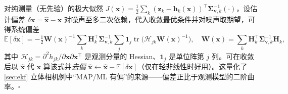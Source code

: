 \begin{derivation}[（选读）ML 偏差的近似闭式]
对纯测量（无先验）的极大似然 $J(\mathbf{x})=\tfrac12\sum_k(\mathbf{z}_k-\mathbf{h}_k(\mathbf{x}))^\top\boldsymbol{\Sigma}_{\mathbf{v},k}^{-1}(\cdot)$，设估计偏差 $\delta\mathbf{x}=\hat{\mathbf{x}}-\mathbf{x}$ 对噪声至多二次依赖，代入收敛最优条件并对噪声取期望，可得系统偏差\cite{barfoot2024state}
\[
  \mathbb{E}[\delta\mathbf{x}]=-\tfrac12\mathbf{W}(\mathbf{x})^{-1}\sum_k\mathbf{H}_k^\top\boldsymbol{\Sigma}_{\mathbf{v},k}^{-1}\sum_j\mathbf{1}_j\operatorname{tr}\!\big(\boldsymbol{\mathcal{H}}_{jk}\mathbf{W}(\mathbf{x})^{-1}\big),\quad
  \mathbf{W}(\mathbf{x})=\sum_k\mathbf{H}_k^\top\boldsymbol{\Sigma}_{\mathbf{v},k}^{-1}\mathbf{H}_k,
\]
其中 $\boldsymbol{\mathcal{H}}_{jk}=\partial^2 h_{jk}/\partial\mathbf{x}\partial\mathbf{x}^\top$ 是观测分量的 Hessian、$\mathbf{1}_j$ 是单位阵第 $j$ 列。可在收敛后以 $\hat{\mathbf{x}}$ 代 $\mathbf{x}$ 算该式并\emph{去偏} $\hat{\mathbf{x}}\leftarrow\hat{\mathbf{x}}-\mathbb{E}[\delta\mathbf{x}]$（仅在轻非线性时好用）。这量化了 \cref{sec:ekf} 立体相机例中“MAP/ML 有偏”的来源——偏差正比于观测模型的二阶曲率。\hfill$\square$
\end{derivation}
